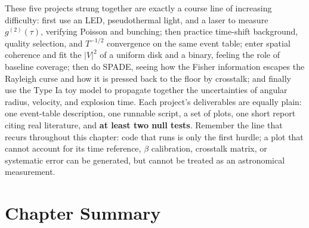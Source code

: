 These five projects strung together are exactly a course line of increasing difficulty: first use an LED, pseudothermal light, and a laser to measure \(g^{(2)}(\tau)\), verifying Poisson and bunching; then practice time-shift background, quality selection, and \(T^{-1/2}\) convergence on the same event table; enter spatial coherence and fit the \(|V|^2\) of a uniform disk and a binary, feeling the role of baseline coverage; then do SPADE, seeing how the Fisher information escapes the Rayleigh curse and how it is pressed back to the floor by crosstalk; and finally use the Type Ia toy model to propagate together the uncertainties of angular radius, velocity, and explosion time. Each project's deliverables are equally plain: one event-table description, one runnable script, a set of plots, one short report citing real literature, and \textbf{at least two null tests}. Remember the line that recurs throughout this chapter: code that runs is only the first hurdle; a plot that cannot account for its time reference, \(\beta\) calibration, crosstalk matrix, or systematic error can be generated, but cannot be treated as an astronomical measurement.

\section*{Chapter Summary}

